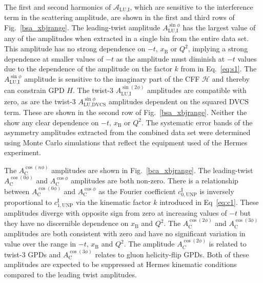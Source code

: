 The first and second harmonics of $\mathcal{A}_{\textrm{LU,I}}$, which are
sensitive to the interference term in the scattering amplitude, are shown in the first and third rows of Fig.~\ref{bsa_xbjrange}. The leading-twist amplitude $A_{\textrm{LU,I}}^{\sin\phi}$ has the largest value of any of the amplitudes when extracted in a single bin from the entire data set. This amplitude has no strong dependence on $-t$, $x_{\textrm{B}}$ or $Q^{2}$, implying a strong dependence at smaller values of $-t$ as the amplitude must diminish at  $-t$ values due to the dependence of the amplitude on the factor $k$ from in Eq.~\ref{eq:s1}. The $A_{\textrm{LU,I}}^{\sin\phi}$ amplitude is sensitive to the imaginary part of the CFF $\mathcal{H}$ and thereby can constrain GPD $\textit{H}$. The twist-3 $A_{\textrm{LU,I}}^{\sin(2\phi)}$ amplitudes are compatible with zero, as are the twist-3 $A_{\textrm{LU,DVCS}}^{\sin\phi}$ amplitudes dependent on the squared DVCS term. These  are shown in the second row of Fig.~\ref{bsa_xbjrange}. Neither the  show any clear dependence on $-t$, $x_{\textrm{B}}$ or $Q^{2}$. The systematic error bands of the asymmetry amplitudes extracted from the combined data set were determined using Monte Carlo simulations that reflect the equipment used  of the H{\sc ermes} experiment. 

The $A_{\textrm{C}}^{\cos(n\phi)}$ amplitudes are shown in Fig.~\ref{bca_xbjrange}. The leading-twist $A_{\textrm{C}}^{\cos(0\phi)}$ and $A_{\textrm{C}}^{\cos\phi}$ amplitudes are both non-zero. There is a relationship between $A_{\textrm{C}}^{\cos(0\phi)}$ and $A_{\textrm{C}}^{\cos\phi}$ as the Fourier coefficient $c^{\textrm{I}}_{0,\textrm{UNP}}$ is inversely proportional to $c^{\textrm{I}}_{1,\textrm{UNP}}$ via the kinematic factor $k$ introduced in Eq~\ref{eq:c1}. These amplitudes diverge with opposite sign from zero at increasing values of $-t$ but they
have no discernible dependence on $x_{\textrm{B}}$ and $Q^{2}$. The $A_{\textrm{C}}^{\cos(2\phi)}$ and $A_{\textrm{C}}^{\cos(3\phi)}$ amplitudes are both consistent with zero and have no significant variation in value over the range in $-t$, $x_{\textrm{B}}$ and $Q^{2}$. The amplitude $A_{C}^{\cos(2\phi)}$ is related to twist-3 GPDs and $A_{\textrm{C}}^{\cos(3\phi)}$ relates to gluon helicity-flip GPDs. Both of these amplitudes are expected to be suppressed at H{\sc ermes} kinematic conditions compared to the leading twist amplitudes.

